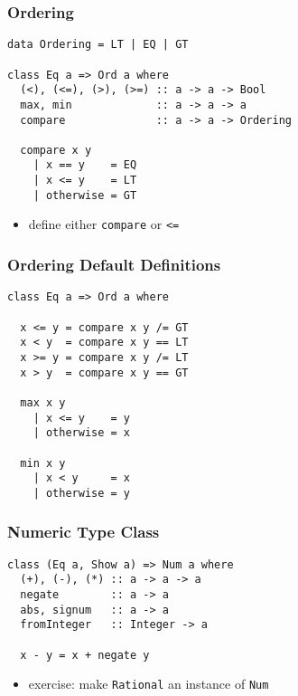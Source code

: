 \documentclass[dvipsnames]{beamer}
\theoremstyle{plain}
\begin{document}
\begin{frame}[fragile]
  \frametitle{Ordering}

  \begin{exampleblock}{}
    \begin{lstlisting}
data Ordering = LT | EQ | GT

class Eq a => Ord a where
  (<), (<=), (>), (>=) :: a -> a -> Bool
  max, min             :: a -> a -> a
  compare              :: a -> a -> Ordering

  compare x y
    | x == y    = EQ
    | x <= y    = LT
    | otherwise = GT
    \end{lstlisting}
  \end{exampleblock}

  \begin{itemize}
    \item define either \lstinline|compare| or \lstinline|<=|
  \end{itemize}
\end{frame}

\begin{frame}[fragile]
  \frametitle{Ordering Default Definitions}

  \begin{exampleblock}{}
    \begin{lstlisting}
class Eq a => Ord a where

  x <= y = compare x y /= GT
  x < y  = compare x y == LT
  x >= y = compare x y /= LT
  x > y  = compare x y == GT

  max x y
    | x <= y    = y
    | otherwise = x

  min x y
    | x < y     = x
    | otherwise = y
    \end{lstlisting}
  \end{exampleblock}
\end{frame}

\begin{frame}[fragile]
  \frametitle{Numeric Type Class}

  \begin{exampleblock}{}
    \begin{lstlisting}
class (Eq a, Show a) => Num a where
  (+), (-), (*) :: a -> a -> a
  negate        :: a -> a
  abs, signum   :: a -> a
  fromInteger   :: Integer -> a

  x - y = x + negate y
    \end{lstlisting}
  \end{exampleblock}

  \begin{itemize}
    \item exercise: make \lstinline|Rational| an instance of
      \lstinline|Num|
  \end{itemize}
\end{frame}
\end{document}
